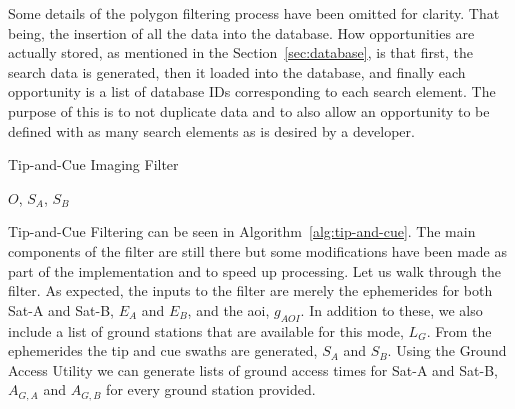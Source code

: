 Some details of the polygon filtering process have been omitted for clarity.
That being, the insertion of all the data into the database. How opportunities
are actually stored, as mentioned in the Section~\ref{sec:database}, is that
first, the search data is generated, then it loaded into the database, and
finally each opportunity is a list of database IDs corresponding to each search
element. The purpose of this is to not duplicate data and to also allow an
opportunity to be defined with as many search elements as is desired by a
developer.


\begin{algorithm} 
    \caption{Tip-and-Cue Imaging Filter}
    \label{alg:tip-and-cue} 
    \begin{algorithmic}[1] 

	     
	     

	     




		 


		\EndIf

	    \EndFor

	\State \Return $O$, $S_A$, $S_B$
	\EndFunction
    \end{algorithmic}
\end{algorithm}

Tip-and-Cue Filtering can be seen in Algorithm~\ref{alg:tip-and-cue}. The main
components of the filter are still there but some modifications have been made
as part of the implementation and to speed up processing. Let us walk through
the filter. As expected, the inputs to the filter are merely the ephemerides
for both Sat-A and Sat-B, $E_A$ and $E_B$, and the \gls{aoi}, $g_{AOI}$. In
addition to these, we also include a list of ground stations that are available
for this mode, $L_G$. From the ephemerides the tip and cue swaths are
generated, $S_A$ and $S_B$.  Using the Ground Access Utility we can generate
lists of ground access times for Sat-A and Sat-B, $A_{G,A}$ and $A_{G,B}$ for
every ground station provided. 

